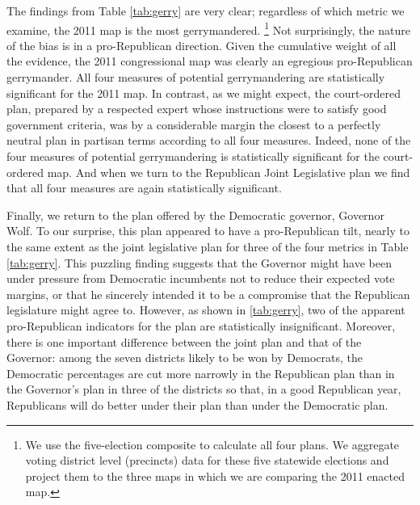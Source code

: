 \par
    The findings from Table \ref{tab:gerry} are very clear; regardless of which metric we examine, the 2011 map is the most gerrymandered.
        \footnote{We use the five-election composite to calculate all four plans. We aggregate voting district level (precincts) data for these five statewide elections and project them to the three maps in which we are comparing the 2011 enacted map.}
%
    Not surprisingly, the nature of the bias is in a pro-Republican direction. Given the cumulative weight of all the evidence, the 2011 congressional map was clearly an egregious pro-Republican gerrymander. All four measures of potential gerrymandering are statistically significant for the 2011 map. In contrast, as we might expect, the court-ordered plan, prepared by a respected expert whose instructions were to satisfy good government criteria, was by a considerable margin the closest to a perfectly neutral plan in partisan terms according to all four measures. Indeed, none of the four measures of potential gerrymandering is statistically significant for the court-ordered map. And when we turn to the Republican Joint Legislative plan we find that all four measures are again statistically significant.  
\par
    Finally, we return to the plan offered by the Democratic governor, Governor Wolf. To our surprise, this plan appeared to have a pro-Republican tilt, nearly to the same extent as the joint legislative plan for three of the four metrics in Table \ref{tab:gerry}. This puzzling finding suggests that the Governor might have been under pressure from Democratic incumbents not to reduce their expected vote margins, or that he sincerely intended it to be a compromise that the Republican legislature might agree to. However, as shown in \ref{tab:gerry}, two of the apparent pro-Republican indicators for the plan are statistically insignificant. Moreover, there is one important difference between the joint plan and that of the Governor: among the seven districts likely to be won by Democrats, the Democratic percentages are cut more narrowly in the Republican plan than in the Governor’s plan in three of the districts so that, in a good Republican year, Republicans will do better under their plan than under the Democratic plan.
